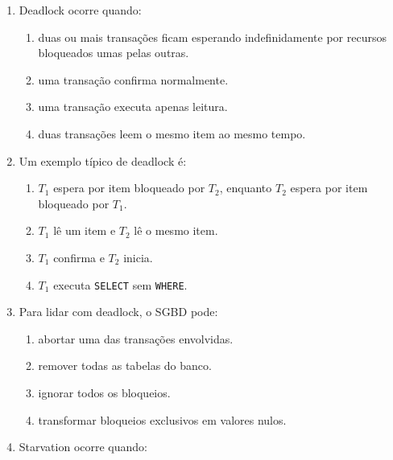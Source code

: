 \documentclass[12pt,a4paper]{article}
\begin{document}
\begin{enumerate}[label=\textbf{Q\arabic*.}]
\begin{enumerate}[label=\alph*)]
    \item pode ocorrer deadlock.
    \item nunca permite concorrência.
    \item não garante serializabilidade.
    \item elimina todos os bloqueios.
\end{enumerate}

\item Deadlock ocorre quando:

\begin{enumerate}[label=\alph*)]
    \item duas ou mais transações ficam esperando indefinidamente por recursos bloqueados umas pelas outras.
    \item uma transação confirma normalmente.
    \item uma transação executa apenas leitura.
    \item duas transações leem o mesmo item ao mesmo tempo.
\end{enumerate}

\item Um exemplo típico de deadlock é:

\begin{enumerate}[label=\alph*)]
    \item $T_1$ espera por item bloqueado por $T_2$, enquanto $T_2$ espera por item bloqueado por $T_1$.
    \item $T_1$ lê um item e $T_2$ lê o mesmo item.
    \item $T_1$ confirma e $T_2$ inicia.
    \item $T_1$ executa \texttt{SELECT} sem \texttt{WHERE}.
\end{enumerate}

\item Para lidar com deadlock, o SGBD pode:

\begin{enumerate}[label=\alph*)]
    \item abortar uma das transações envolvidas.
    \item remover todas as tabelas do banco.
    \item ignorar todos os bloqueios.
    \item transformar bloqueios exclusivos em valores nulos.
\end{enumerate}

\item Starvation ocorre quando:


\end{enumerate}
\end{document}
